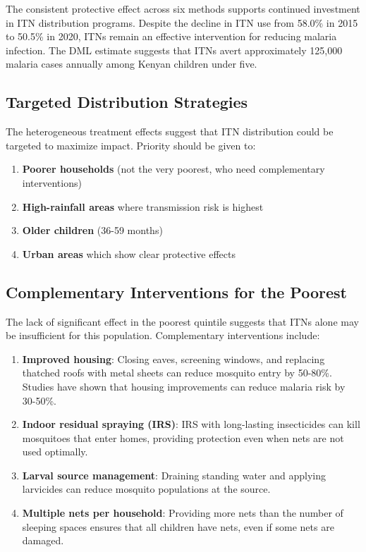 The consistent protective effect across six methods supports continued investment in ITN distribution programs. Despite the decline in ITN use from 58.0\% in 2015 to 50.5\% in 2020, ITNs remain an effective intervention for reducing malaria infection. The DML estimate suggests that ITNs avert approximately 125,000 malaria cases annually among Kenyan children under five.

\subsection{Targeted Distribution Strategies}

The heterogeneous treatment effects suggest that ITN distribution could be targeted to maximize impact. Priority should be given to:

\begin{enumerate}
	\item \textbf{Poorer households} (not the very poorest, who need complementary interventions)
	\item \textbf{High-rainfall areas} where transmission risk is highest
	\item \textbf{Older children} (36-59 months)
	\item \textbf{Urban areas} which show clear protective effects
\end{enumerate}

\subsection{Complementary Interventions for the Poorest}

The lack of significant effect in the poorest quintile suggests that ITNs alone may be insufficient for this population. Complementary interventions include:

\begin{enumerate}
	\item \textbf{Improved housing}: Closing eaves, screening windows, and replacing thatched roofs with metal sheets can reduce mosquito entry by 50-80\%. Studies have shown that housing improvements can reduce malaria risk by 30-50\%.
	
	\item \textbf{Indoor residual spraying (IRS)}: IRS with long-lasting insecticides can kill mosquitoes that enter homes, providing protection even when nets are not used optimally.
	
	\item \textbf{Larval source management}: Draining standing water and applying larvicides can reduce mosquito populations at the source.
	
	\item \textbf{Multiple nets per household}: Providing more nets than the number of sleeping spaces ensures that all children have nets, even if some nets are damaged.
\end{enumerate}

